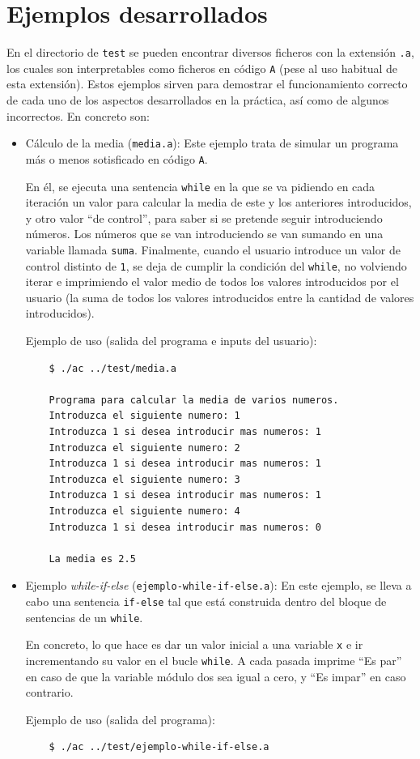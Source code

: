 \documentclass[12pt]{article}
\begin{document}
\section{Ejemplos desarrollados}
En el directorio de \texttt{test} se pueden encontrar diversos ficheros con la extensión \texttt{.a}, los cuales son interpretables como ficheros en código \texttt{A} (pese al uso habitual de esta extensión). Estos ejemplos sirven para demostrar el funcionamiento correcto de cada uno de los aspectos desarrollados en la práctica, así como de algunos incorrectos. En concreto son:
\begin{itemize}
    \item Cálculo de la media (\texttt{media.a}): Este ejemplo trata de simular un programa más o menos sotisficado en código \texttt{A}.\par
    En él, se ejecuta una sentencia \texttt{while} en la que se va pidiendo en cada iteración un valor para calcular la media de este y los anteriores introducidos, y otro valor ``de control'', para saber si se pretende seguir introduciendo números. Los números que se van introduciendo se van sumando en una variable llamada \texttt{suma}. Finalmente, cuando el usuario introduce un valor de control distinto de \texttt{1}, se deja de cumplir la condición del \texttt{while}, no volviendo iterar e imprimiendo el valor medio de todos los valores introducidos por el usuario (la suma de todos los valores introducidos entre la cantidad de valores introducidos).\par
    Ejemplo de uso (salida del programa e inputs del usuario):
    \begin{verbatim}
    $ ./ac ../test/media.a

    Programa para calcular la media de varios numeros.
    Introduzca el siguiente numero: 1
    Introduzca 1 si desea introducir mas numeros: 1
    Introduzca el siguiente numero: 2
    Introduzca 1 si desea introducir mas numeros: 1
    Introduzca el siguiente numero: 3
    Introduzca 1 si desea introducir mas numeros: 1
    Introduzca el siguiente numero: 4
    Introduzca 1 si desea introducir mas numeros: 0
    
    La media es 2.5
    \end{verbatim}
    
    \item Ejemplo \textit{while-if-else} (\texttt{ejemplo-while-if-else.a}): En este ejemplo, se lleva a cabo una sentencia \texttt{if-else} tal que está construida dentro del bloque de sentencias de un \texttt{while}.\par
    En concreto, lo que hace es dar un valor inicial a una variable \texttt{x} e ir incrementando su valor en el bucle \texttt{while}. A cada pasada imprime ``Es par'' en caso de que la variable módulo dos sea igual a cero, y ``Es impar'' en caso contrario.\par
    Ejemplo de uso (salida del programa):
    \begin{verbatim}
    $ ./ac ../test/ejemplo-while-if-else.a


\end{verbatim}
\end{itemize}
\end{document}
